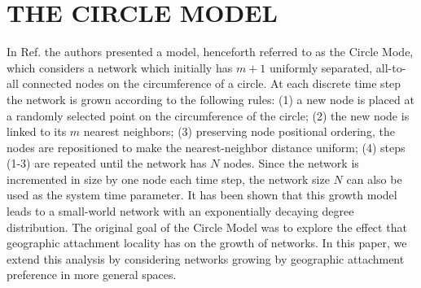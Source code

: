 \documentclass[aps,pre,manuscript,superscriptaddress,amsmath,amssymb,nofootinbib]{revtex4-1}
\begin{document}
\section{THE CIRCLE MODEL}
In Ref. \cite{ozik2004} the authors presented a model, henceforth referred to as the Circle Mode, which considers a network which initially has $m+1$ uniformly separated, all-to-all connected nodes on the circumference of a circle. 
At each discrete time step the network is grown according to the following rules: 
(1) a new node is placed at a randomly selected point on the circumference of the circle;
(2) the new node is linked to its $m$ nearest neighbors;
(3) preserving node positional ordering, the nodes are repositioned to make the nearest-neighbor distance uniform;
(4) steps (1-3) are repeated until the network has $N$ nodes.
Since the network is incremented in size by one node each time step, the network size $N$ can also be used as the system time parameter.  
It has been shown \cite{ozik2004} that this growth model leads to a small-world network with an exponentially decaying degree distribution. 
The original goal of the Circle Model was to explore the effect that geographic attachment locality has on the growth of networks.
In this paper, we extend this analysis by considering networks growing by geographic attachment preference in more general spaces. 
\end{document}
